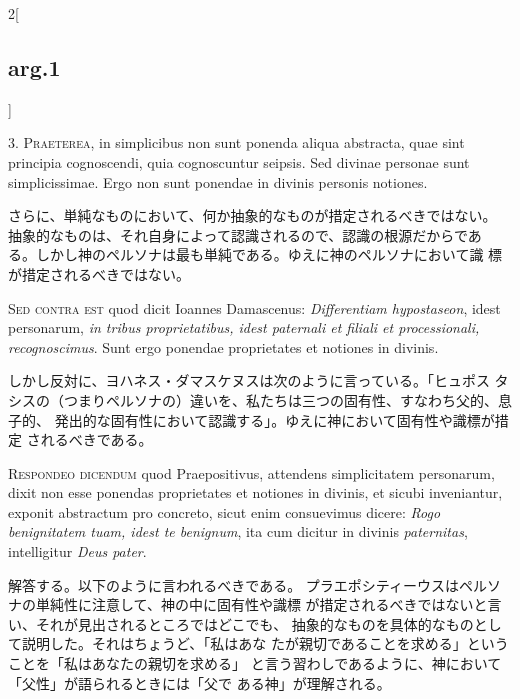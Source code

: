 \documentclass[paper=a4paper,fontsize=10pt,jafontsize=9pt,titlepage]{jlreq}
\begin{document}
\begin{paracol}{2}[\subsection{arg.1}]

3. {\scshape Praeterea}, in simplicibus non sunt ponenda aliqua abstracta, quae sint
principia cognoscendi, quia cognoscuntur seipsis. Sed divinae personae
sunt simplicissimae. Ergo non sunt ponendae in divinis personis
notiones.

\switchcolumn

さらに、単純なものにおいて、何か抽象的なものが措定されるべきではない。
 抽象的なものは、それ自身によって認識されるので、認識の根源だからであ
 る。しかし神のペルソナは最も単純である。ゆえに神のペルソナにおいて識
 標が措定されるべきではない。

\switchcolumn*[\subsection{s.c.}]

{\scshape Sed contra est} quod dicit Ioannes Damascenus: {\itshape Differentiam
hypostaseon}, idest personarum, {\itshape in tribus proprietatibus, idest
paternali et filiali et processionali, recognoscimus}. Sunt ergo
ponendae proprietates et notiones in divinis.

\switchcolumn

しかし反対に、ヨハネス・ダマスケヌスは次のように言っている。「ヒュポス
 タシスの（つまりペルソナの）違いを、私たちは三つの固有性、すなわち父的、息子的、
 発出的な固有性において認識する」。ゆえに神において固有性や識標が措定
 されるべきである。


{\scshape Respondeo dicendum} quod Praepositivus, attendens simplicitatem
personarum, dixit non esse ponendas proprietates et notiones in
divinis, et sicubi inveniantur, exponit abstractum pro concreto, sicut
enim consuevimus dicere: {\itshape Rogo benignitatem tuam, idest te benignum},
ita cum dicitur in divinis {\itshape paternitas}, intelligitur {\itshape Deus pater}.

\switchcolumn

解答する。以下のように言われるべきである。
プラエポシティーウスはペルソナの単純性に注意して、神の中に固有性や識標
 が措定されるべきではないと言い、それが見出されるところではどこでも、
 抽象的なものを具体的なものとして説明した。それはちょうど、「私はあな
 たが親切であることを求める」ということを「私はあなたの親切を求める」
 と言う習わしであるように、神において「父性」が語られるときには「父で
 ある神」が理解される。


\end{paracol}
\end{document}
